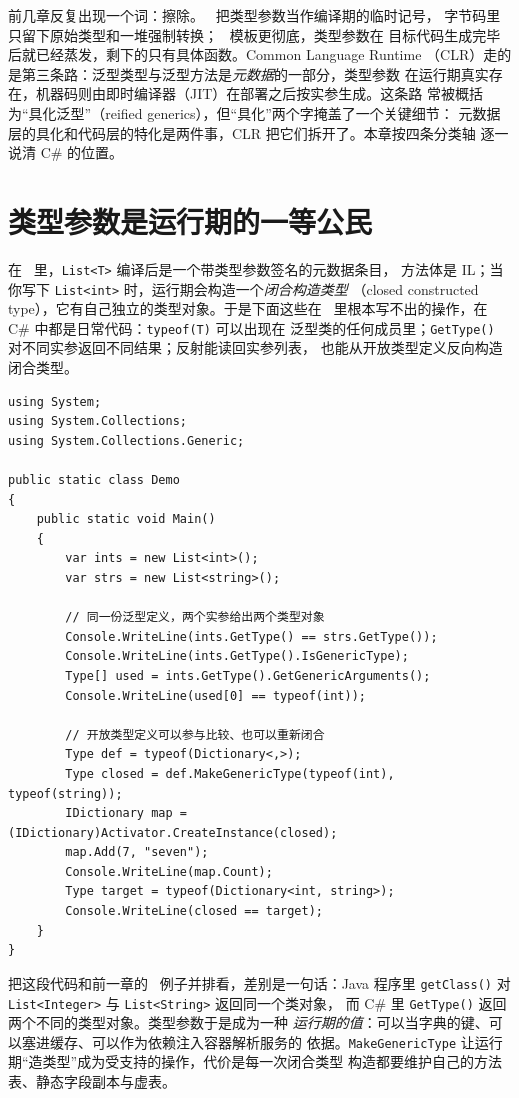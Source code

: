 \documentclass[12pt,a4paper,fontset=fandol]{ctexbook}
\newcommand{\cpplabel}{%
  \tcbox[on line,colback=cppheadbg,colframe=cppheadbg,
    boxrule=0pt,arc=1pt,left=2pt,right=2pt,top=1pt,bottom=1pt,
    colupper=white,fontupper=\scriptsize\bfseries]{C++}}
\newcommand{\javalabel}{%
  \tcbox[on line,colback=javaheadbg,colframe=javaheadbg,
    boxrule=0pt,arc=1pt,left=2pt,right=2pt,top=1pt,bottom=1pt,
    colupper=white,fontupper=\scriptsize\bfseries]{Java}}
\newcommand{\csharplabel}{%
  \tcbox[on line,colback=csharpheadbg,colframe=csharpheadbg,
    boxrule=0pt,arc=1pt,left=2pt,right=2pt,top=1pt,bottom=1pt,
    colupper=white,fontupper=\scriptsize\bfseries]{C\#}}
\newcommand{\kw}[1]{\texttt{#1}}
\begin{document}
前几章反复出现一个词：擦除。\javalabel\ 把类型参数当作编译期的临时记号，
字节码里只留下原始类型和一堆强制转换；\cpplabel\ 模板更彻底，类型参数在
目标代码生成完毕后就已经蒸发，剩下的只有具体函数。Common Language Runtime
（CLR）走的是第三条路：泛型类型与泛型方法是\emph{元数据}的一部分，类型参数
在运行期真实存在，机器码则由即时编译器（JIT）在部署之后按实参生成。这条路
常被概括为“具化泛型”（reified generics），但“具化”两个字掩盖了一个关键细节：
元数据层的具化和代码层的特化是两件事，CLR 把它们拆开了。本章按四条分类轴
逐一说清 C\# 的位置。

\section{类型参数是运行期的一等公民}

在 \csharplabel\ 里，\kw{List<T>} 编译后是一个带类型参数签名的元数据条目，
方法体是 IL；当你写下 \kw{List<int>} 时，运行期会构造一个\emph{闭合构造类型}
（closed constructed type），它有自己独立的类型对象。于是下面这些在
\javalabel\ 里根本写不出的操作，在 C\# 中都是日常代码：\kw{typeof(T)} 可以出现在
泛型类的任何成员里；\kw{GetType()} 对不同实参返回不同结果；反射能读回实参列表，
也能从开放类型定义反向构造闭合类型。

\begin{lstlisting}[style=csharpstyle,caption={闭合类型的身份可以用普通手段读回}]
using System;
using System.Collections;
using System.Collections.Generic;

public static class Demo
{
    public static void Main()
    {
        var ints = new List<int>();
        var strs = new List<string>();

        // 同一份泛型定义，两个实参给出两个类型对象
        Console.WriteLine(ints.GetType() == strs.GetType());
        Console.WriteLine(ints.GetType().IsGenericType);
        Type[] used = ints.GetType().GetGenericArguments();
        Console.WriteLine(used[0] == typeof(int));

        // 开放类型定义可以参与比较、也可以重新闭合
        Type def = typeof(Dictionary<,>);
        Type closed = def.MakeGenericType(typeof(int), typeof(string));
        IDictionary map = (IDictionary)Activator.CreateInstance(closed);
        map.Add(7, "seven");
        Console.WriteLine(map.Count);
        Type target = typeof(Dictionary<int, string>);
        Console.WriteLine(closed == target);
    }
}
\end{lstlisting}

把这段代码和前一章的 \javalabel\ 例子并排看，差别是一句话：Java 程序里
\kw{getClass()} 对 \kw{List<Integer>} 与 \kw{List<String>} 返回同一个类对象，
而 C\# 里 \kw{GetType()} 返回两个不同的类型对象。类型参数于是成为一种
\emph{运行期的值}：可以当字典的键、可以塞进缓存、可以作为依赖注入容器解析服务的
依据。\kw{MakeGenericType} 让运行期“造类型”成为受支持的操作，代价是每一次闭合类型
构造都要维护自己的方法表、静态字段副本与虚表。
\end{document}

